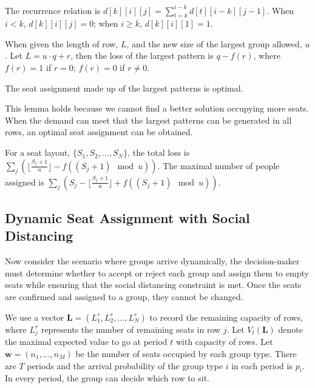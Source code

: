 The recurrence relation is $d[k][i][j] = \sum_{t=k}^{i-k} d[t][i-k][j-1]$. 
When $i < k$, $d[k][i][j] =0$; when $i \geq k$, $d[k][i][1] =1$.

\begin{lem}
When given the length of row, $L$, and the new size of the largest group allowed, $u$. Let $L = u\cdot q + r$, then the loss of the largest pattern is $q - f(r)$, where $f(r) =1$ if $r=0$; $f(r) =0$ if $r \neq 0$.
\end{lem}

\begin{lem}
The seat assignment made up of the largest patterns is optimal.
\end{lem}

This lemma holds because we cannot find a better solution occupying more seats. When the demand can meet that the largest patterns can be generated in all rows, an optimal seat assignment can be obtained.

\begin{prop}
For a seat layout, $\{S_1, S_2, \ldots, S_{N}\}$, the total loss is $\sum_{j} (\lfloor \frac{S_j+1}{u} \rfloor - f((S_j +1)\mod u))$. The maximal number of people assigned is $\sum_{j} (S_j - \lfloor \frac{S_j+1}{u} \rfloor + f((S_j +1)\mod u))$.
\end{prop}

\subsection{Dynamic Seat Assignment with Social Distancing}


Now consider the scenario where groups arrive dynamically, the decision-maker must determine whether to accept or reject each group and assign them to empty seats while ensuring that the social distancing constraint is met. Once the seats are confirmed and assigned to a group, they cannot be changed.

We use a vector $\mathbf{L}= (L^{r}_1, L^{r}_2, \ldots, L^{r}_{N})$ to record the remaining capacity of rows, where $L^{r}_{j}$ represents the number of remaining seats in row $j$. Let $V_{t}(\mathbf{L})$ denote the maximal expected value to go at period $t$ with capacity of rows. Let $\mathbf{w} = (n_1, \ldots, n_{M})$ be the number of seats occupied by each group type. There are $T$ periods and the arrival probability of the group type $i$ in each period is $p_i$. In every period, the group can decide which row to sit.

